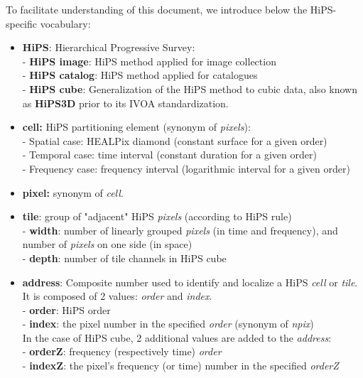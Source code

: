 \documentclass[11pt,a4paper]{ivoa}
\begin{document}
\medskip

To facilitate understanding of this document, we introduce below the HiPS-specific vocabulary:

\begin{tcolorbox}

\begin{itemize}[noitemsep,topsep=0pt,parsep=0pt,partopsep=0pt]
\item {\bf HiPS}: Hierarchical Progressive Survey:\\
    - {\bf HiPS image}: HiPS method applied for image collection\\
    - {\bf HiPS catalog}: HiPS method applied for catalogues\\
    - {\bf HiPS cube}: Generalization of the HiPS method to cubic data, also known as {\bf HiPS3D} prior to its IVOA standardization.
\item {\bf cell:} HiPS partitioning element (synonym of {\em pixels}):\\
    - Spatial case: HEALPix diamond (constant surface for a given order)\\
    - Temporal case: time interval (constant duration for a given order)\\
    - Frequency case: frequency interval (logarithmic interval for a given order)
\item {\bf pixel:} synonym of {\em cell}.
\item {\bf tile}: group of "adjacent" HiPS {\em pixels} (according to HiPS rule)\\
    - {\bf width}: number of linearly grouped {\em pixels} (in time and frequency), and number of {\em pixels} on one side (in space)\\
    - {\bf depth}: number of tile channels in HiPS cube\\
\item {\bf address}: Composite number used to identify and localize a HiPS {\em cell} or {\em tile}. It is composed of 2 values: {\em order} and {\em index}.\\
    - {\bf order}: HiPS order\\
    - {\bf index}: the pixel number in the specified {\em order}  (synonym of {\em npix})\\
   In the case of HiPS cube, 2 additional values are added to the {\em address}:\\
    - {\bf orderZ}: frequency (respectively time) {\em order}\\
    - {\bf indexZ}: the pixel's frequency (or time) number in the specified {\em orderZ}\\

\end{itemize}
\end{tcolorbox}
\end{document}
